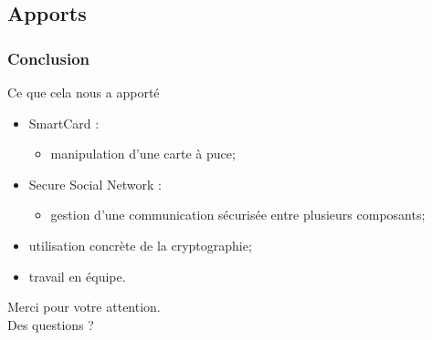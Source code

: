 \documentclass{beamer}
\begin{document}
\subsection{Apports}
\begin{frame}
    \frametitle{Conclusion}
    \begin{block}{Ce que cela nous a apporté}
        \begin{itemize}
            \item SmartCard : 
                \begin{itemize}
                    \item manipulation d'une carte à puce;
                \end{itemize}
            \item Secure Social Network : 
                \begin{itemize}
                    \item gestion d'une communication sécurisée entre plusieurs
                        composants;
                \end{itemize}
            \item utilisation concrète de la cryptographie;
            \item travail en équipe.
        \end{itemize}
    \end{block}
\end{frame}

\begin{frame}
\begin{center}Merci pour votre attention.\\[2cm]
          Des questions ?\end{center}
\end{frame}
\end{document}

